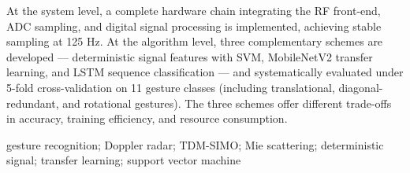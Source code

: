 At the system level, a complete hardware chain integrating the RF front-end, ADC sampling, and digital signal processing is implemented, achieving stable sampling at 125 Hz. At the algorithm level, three complementary schemes are developed --- deterministic signal features with SVM, MobileNetV2 transfer learning, and LSTM sequence classification --- and systematically evaluated under 5-fold cross-validation on 11 gesture classes (including translational, diagonal-redundant, and rotational gestures). The three schemes offer different trade-offs in accuracy, training efficiency, and resource consumption.

gesture recognition; Doppler radar; TDM-SIMO; Mie scattering; deterministic signal; transfer learning; support vector machine